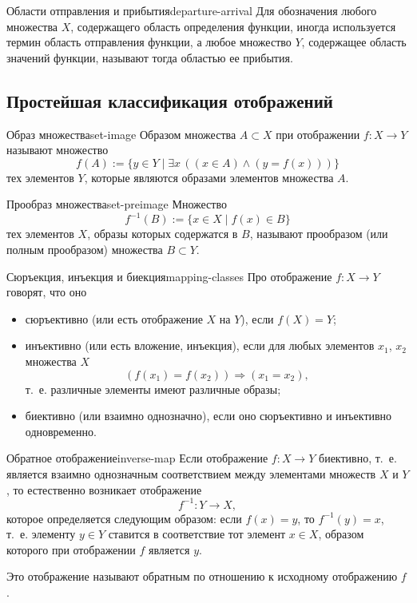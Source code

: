 \begin{definition}{Области отправления и прибытия}{departure-arrival}
  Для обозначения любого множества $X$, содержащего область определения
  функции, иногда используется термин область отправления функции, а любое
  множество $Y$, содержащее область значений функции, называют тогда
  областью ее прибытия.
\end{definition}

\subsection{Простейшая классификация отображений}

\begin{definition}{Образ множества}{set-image}
  Образом множества $A\subset X$ при отображении $f:X\to Y$ называют
  множество
  \[
    f(A):=\{y\in Y\mid\exists x\,((x\in A)\land(y=f(x)))\}
  \]
  тех элементов $Y$, которые являются образами элементов множества $A$.
\end{definition}

\begin{definition}{Прообраз множества}{set-preimage}
  Множество
  \[
    f^{-1}(B):=\{x\in X\mid f(x)\in B\}
  \]
  тех элементов $X$, образы которых содержатся в $B$, называют прообразом
  (или полным прообразом) множества $B\subset Y$.
\end{definition}

\begin{definition}{Сюръекция, инъекция и биекция}{mapping-classes}
  Про отображение $f:X\to Y$ говорят, что оно
  \begin{itemize}
    \item сюръективно (или есть отображение $X$ на $Y$), если $f(X)=Y$;
    \item инъективно (или есть вложение, инъекция), если для любых элементов
      $x_1$, $x_2$ множества $X$
      \[
        (f(x_1)=f(x_2))\Rightarrow(x_1=x_2),
      \]
      т.~е. различные элементы имеют различные образы;
    \item биективно (или взаимно однозначно), если оно сюръективно и
      инъективно одновременно.
  \end{itemize}
\end{definition}

\begin{definition}{Обратное отображение}{inverse-map}
  Если отображение $f:X\to Y$ биективно, т.~е. является взаимно однозначным
  соответствием между элементами множеств $X$ и $Y$, то естественно возникает
  отображение
  \[
    f^{-1}:Y\to X,
  \]
  которое определяется следующим образом: если $f(x)=y$, то $f^{-1}(y)=x$,
  т.~е. элементу $y\in Y$ ставится в соответствие тот элемент $x\in X$,
  образом которого при отображении $f$ является $y$.

  Это отображение называют обратным по отношению к исходному отображению
  $f$.
\end{definition}

